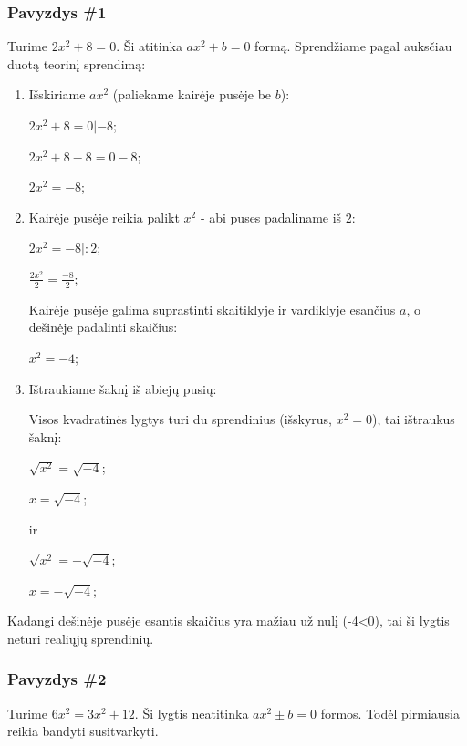 \documentclass[a4paper]{article}
\begin{document}
\subsubsection{Pavyzdys \#1}

Turime $ 2x^{2}+8=0 $. Ši atitinka $ ax^{2}+b=0 $ formą. Sprendžiame pagal
auksčiau duotą teorinį sprendimą:

\begin{enumerate}
      \item  Išskiriame $ ax^{2} $ (paliekame kairėje pusėje be $ b $):

            $ 2x^{2}+8=0 | -8 $;

            $ 2x^{2}+8-8=0-8 $;

            $ 2x^{2}=-8 $;

      \item Kairėje pusėje reikia palikt $ x^2 $ - abi puses padaliname iš $ 2
            $:

            $ 2x^{2}=-8 |:2 $;

            $ \frac{2x^{2}}{2}=\frac{-8}{2}$;

            Kairėje pusėje galima suprastinti skaitiklyje ir vardiklyje
            esančius
            $ a $, o dešinėje padalinti skaičius:

            $ x^{2}=-4$;

      \item Ištraukiame šaknį iš abiejų pusių:

            Visos kvadratinės lygtys turi du sprendinius (išskyrus, $ x^2=0 $),
            tai ištraukus šaknį:

            $ \sqrt{x^{2}}=\sqrt{-4}$;

            $ x=\sqrt{-4}$;

            ir

            $ \sqrt{x^{2}}=-\sqrt{-4}$;

            $ x=-\sqrt{-4}$;

\end{enumerate}

Kadangi dešinėje pusėje esantis skaičius yra mažiau už nulį (-4<0), tai ši
lygtis neturi realiųjų sprendinių.

\subsubsection{Pavyzdys \#2}

Turime $ 6x^{2}=3x^{2}+12 $. Ši lygtis neatitinka $ ax^{2}\pm b=0 $ formos.
Todėl pirmiausia reikia bandyti susitvarkyti.
\end{document}

